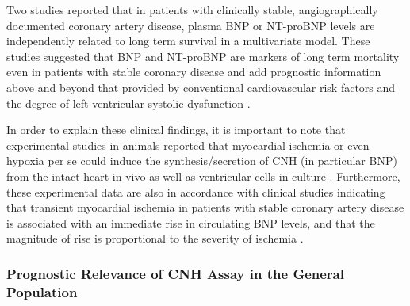 \documentclass[14pt,a4paper,onecolumn]{extarticle}
\begin{document}
Two  studies reported that in patients with clinically stable, angiographically documented coronary artery disease, plasma BNP \citep{bib3241} or NT-proBNP \citep{bib3242} levels are independently related to long term survival in a multivariate model. These studies suggested that BNP and NT-proBNP are markers of long term mortality even in patients with stable coronary disease and add prognostic information above and beyond that provided by conventional cardiovascular risk factors and the degree of left ventricular systolic dysfunction \citep{bib3241} \citep{bib3242}.

In order to explain these clinical findings, it is important to note that experimental studies in animals reported that myocardial ischemia or even hypoxia per se could induce the synthesis/secretion of CNH (in particular BNP) from the intact heart in vivo as well as ventricular cells in culture \citep{bib3243} \citep{bib3244}. Furthermore, these experimental data are also in accordance with  clinical studies indicating that transient myocardial ischemia in patients with stable coronary artery disease is associated with an immediate rise in circulating BNP levels, and that the magnitude of rise is proportional to the severity of ischemia \citep{bib3163} \citep{bib3164} \citep{bib3246}.


\subsubsection{ Prognostic Relevance of CNH Assay in the General Population}
\end{document}
